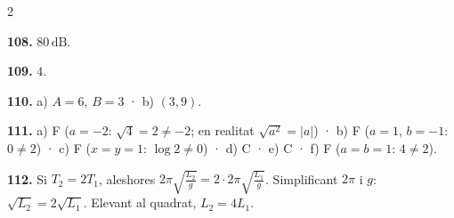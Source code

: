 \documentclass[13pt,a4paper]{extarticle}
\begin{document}
\begin{multicols}{2}
\par\noindent\begin{minipage}{\linewidth}
\textbf{108.} $80\,\text{dB}$.\par
\end{minipage}\par\vspace{1.6mm}
\par\noindent\begin{minipage}{\linewidth}
\textbf{109.} $4$.\par
\end{minipage}\par\vspace{1.6mm}
\par\noindent\begin{minipage}{\linewidth}
\textbf{110.} a) $A=6$, $B=3$ · b) $\left(3,9\right)$.\par
\end{minipage}\par\vspace{1.6mm}
\par\noindent\begin{minipage}{\linewidth}
\textbf{111.} a) F ($a=-2$: $\sqrt{4}=2\neq-2$; en realitat $\sqrt{a^2}=|a|$) · b) F ($a=1$, $b=-1$: $0\neq2$) · c) F ($x=y=1$: $\log2\neq0$) · d) C · e) C · f) F ($a=b=1$: $4\neq2$).\par
\end{minipage}\par\vspace{1.6mm}
\par\noindent\begin{minipage}{\linewidth}
\textbf{112.} Si $T_2=2T_1$, aleshores $2\pi\sqrt{\tfrac{L_2}{g}}=2\cdot2\pi\sqrt{\tfrac{L_1}{g}}$. Simplificant $2\pi$ i $g$: $\sqrt{L_2}=2\sqrt{L_1}$. Elevant al quadrat, $L_2=4L_1$.\par
\end{minipage}\par\vspace{1.6mm}
\end{multicols}
\end{document}
